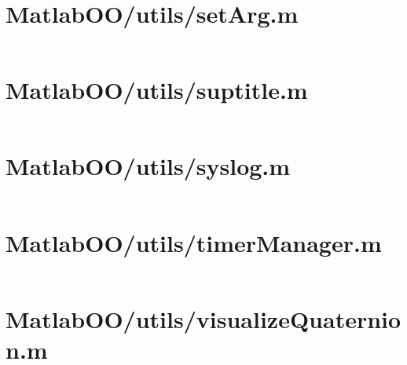 \pagebreak
\section*{MatlabOO/utils/setArg.m}\label{code:MatlabOO/utils/setArg.m}
\inputminted[linenos,fontsize=\scriptsize]{matlab}{/home/dcouture/git/mathyourlife/TSatPy/beta_versions/matlab_object_oriented/utils/setArg.m}

\pagebreak
\section*{MatlabOO/utils/suptitle.m}\label{code:MatlabOO/utils/suptitle.m}
\inputminted[linenos,fontsize=\scriptsize]{matlab}{/home/dcouture/git/mathyourlife/TSatPy/beta_versions/matlab_object_oriented/utils/suptitle.m}

\pagebreak
\section*{MatlabOO/utils/syslog.m}\label{code:MatlabOO/utils/syslog.m}
\inputminted[linenos,fontsize=\scriptsize]{matlab}{/home/dcouture/git/mathyourlife/TSatPy/beta_versions/matlab_object_oriented/utils/syslog.m}

\pagebreak
\section*{MatlabOO/utils/timerManager.m}\label{code:MatlabOO/utils/timerManager.m}
\inputminted[linenos,fontsize=\scriptsize]{matlab}{/home/dcouture/git/mathyourlife/TSatPy/beta_versions/matlab_object_oriented/utils/timerManager.m}

\pagebreak
\section*{MatlabOO/utils/visualizeQuaternion.m}\label{code:MatlabOO/utils/visualizeQuaternion.m}
\inputminted[linenos,fontsize=\scriptsize]{matlab}{/home/dcouture/git/mathyourlife/TSatPy/beta_versions/matlab_object_oriented/utils/visualizeQuaternion.m}

